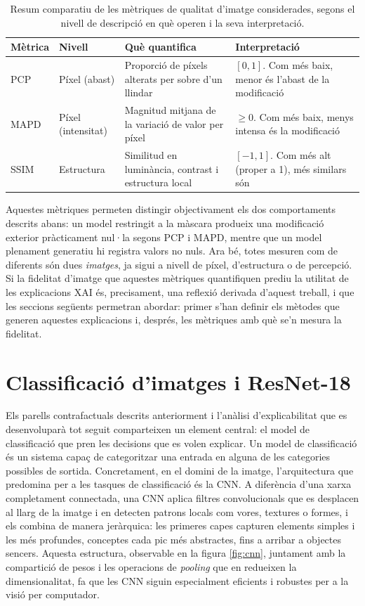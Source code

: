 \begin{table}
\centering
\begin{tabularx}{\textwidth}{@{} ll X X @{}}
\toprule
\textbf{Mètrica} & \textbf{Nivell} & \textbf{Què quantifica} & \textbf{Interpretació} \\
\midrule
\acs{PCP} & Píxel (abast) & Proporció de píxels alterats per sobre d'un llindar & $[0,1]$. Com més baix, menor és l'abast de la modificació \\
\addlinespace
\acs{MAPD} & Píxel (intensitat) & Magnitud mitjana de la variació de valor per píxel & $\geq 0$. Com més baix, menys intensa és la modificació \\
\addlinespace
\acs{SSIM} & Estructura & Similitud en luminància, contrast i estructura local & $[-1,1]$. Com més alt (proper a 1), més similars són \\
\bottomrule
\end{tabularx}
\caption{Resum comparatiu de les mètriques de qualitat d'imatge considerades, segons el nivell de descripció en què operen i la seva interpretació.}
\label{tab:metriques}
\end{table}

Aquestes mètriques permeten distingir objectivament els dos comportaments descrits abans: un model restringit a la màscara produeix una modificació exterior pràcticament nul·la segons \ac{PCP} i \ac{MAPD}, mentre que un model plenament generatiu hi registra valors no nuls. Ara bé, totes mesuren com de diferents són dues \emph{imatges}, ja sigui a nivell de píxel, d'estructura o de percepció. Si la fidelitat d'imatge que aquestes mètriques quantifiquen prediu la utilitat de les explicacions XAI és, precisament, una reflexió derivada d'aquest treball, i que les seccions següents permetran abordar: primer s'han definir els mètodes que generen aquestes explicacions i, després, les mètriques amb què se'n mesura la fidelitat.

\section{Classificació d'imatges i ResNet-18}
Els parells contrafactuals descrits anteriorment i l'anàlisi d'explicabilitat que es desenvoluparà tot seguit comparteixen un element central: el model de classificació que pren les decisions que es volen explicar. Un model de classificació és un sistema capaç de categoritzar una entrada en alguna de les categories possibles de sortida. Concretament, en el domini de la imatge, l'arquitectura que predomina per a les tasques de classificació és la \ac{CNN}. A diferència d'una xarxa completament connectada, una \ac{CNN} aplica filtres convolucionals que es desplacen al llarg de la imatge i en detecten patrons locals com vores, textures o formes, i els combina de manera jeràrquica: les primeres capes capturen elements simples i les més profundes, conceptes cada pic més abstractes, fins a arribar a objectes sencers. Aquesta estructura, observable en la figura \ref{fig:cnn}, juntament amb la compartició de pesos i les operacions de \emph{pooling} que en redueixen la dimensionalitat, fa que les \ac{CNN} siguin especialment eficients i robustes per a la visió per computador.

